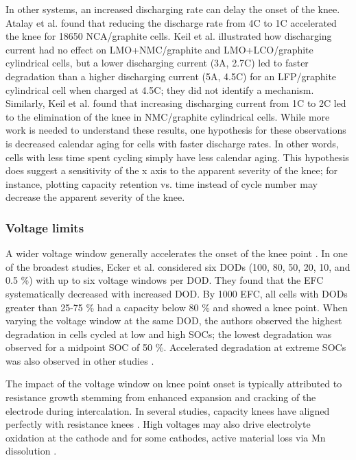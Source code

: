 \documentclass[journal=jpcl, manuscript=article, layout=onecolumn]{achemso}
\begin{document}
In other systems, an increased discharging rate can delay the onset of the knee.
Atalay et al.\cite{atalay_theory_2020} found that reducing the discharge rate from 4C to 1C accelerated the knee for 18650 NCA/graphite cells.
Keil et al.\cite{keil_charging_2016} illustrated how discharging current had no effect on LMO+NMC/graphite and LMO+LCO/graphite cylindrical cells, but a lower discharging current (3A, 2.7C) led to faster degradation than a higher discharging current (5A, 4.5C) for an LFP/graphite cylindrical cell when charged at 4.5C; they did not identify a mechanism. 
Similarly, Keil et al.\cite{keil_linear_2019} found that increasing discharging current from 1C to 2C led to the elimination of the knee in NMC/graphite cylindrical cells.
While more work is needed to understand these results, one hypothesis for these observations is decreased calendar aging for cells with faster discharge rates.
In other words, cells with less time spent cycling simply have less calendar aging. This hypothesis does suggest a sensitivity of the x axis to the apparent severity of the knee; for instance, plotting capacity retention vs. time instead of cycle number may decrease the apparent severity of the knee.

\subsubsection{Voltage limits} 
A wider voltage window generally accelerates the onset of the knee point \cite{ecker_calendar_2014, pfrang_long-term_2018, klett_non-uniform_2014, ma_novel_2019, petzl_lithium_2015, schuster_nonlinear_2015}. In one of the broadest studies, Ecker et al. \cite{ecker_calendar_2014} considered six DODs (100, 80, 50, 20, 10, and 0.5 \%) with up to six voltage windows per DOD. They found that the EFC systematically decreased with increased DOD. By 1000 EFC, all cells with DODs greater than 25-75 \% had a capacity below 80 \% and showed a knee point. When varying the voltage window at the same DOD, the authors observed the highest degradation in cells cycled at low and high SOCs; the lowest degradation was observed for a midpoint SOC of 50 \%. Accelerated degradation at extreme SOCs was also observed in other studies \cite{aiken_accelerated_2020,ma_novel_2019, zhu_investigation_2021}.

The impact of the voltage window on knee point onset is typically attributed to resistance growth stemming from enhanced expansion and cracking of the electrode during intercalation. In several studies, capacity knees have aligned perfectly with resistance knees \cite{ecker_calendar_2014, klett_non-uniform_2014, schuster_nonlinear_2015, zhu_investigation_2021}. High voltages may also drive electrolyte oxidation at the cathode \cite{aiken_accelerated_2020} and for some cathodes, active material loss via Mn dissolution \cite{ma_novel_2019}. 
\end{document}
